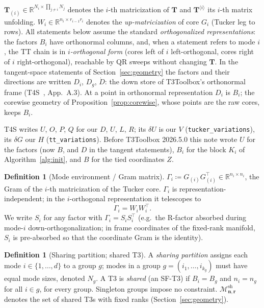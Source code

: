 \documentclass[11pt]{article}
\theoremstyle{definition}
\newtheorem{definition}[theorem]{Definition}
\theoremstyle{remark}
\newcommand{\R}{\mathbb{R}}
\newcommand{\T}{\boldsymbol{T}}
\newcommand{\Msh}{\mathcal{M}^{\mathrm{sh}}_{\boldsymbol{n},\boldsymbol{r}}}
\begin{document}
$\T_{(i)} \in \R^{N_i \times \prod_{j\neq i} N_j}$ denotes the $i$-th
matricization of $\T$ and $\T^{\langle i \rangle}$ its $i$-th matrix
unfolding. $W_i \in \R^{n_i \times r_{i-1} r_i}$ denotes the
\emph{up-matricization} of core $G_i$ (Tucker leg to rows). All statements
below assume the standard \emph{orthogonalized representations}: the factors
$B_i$ have orthonormal columns, and, when a statement refers to mode $i$, the
TT chain is in \emph{$i$-orthogonal form} (cores left of $i$ left-orthogonal,
cores right of $i$ right-orthogonal), reachable by QR sweeps without changing
$\T$. In the tangent-space statements of Section~\ref{sec:geometry} the
factors and their directions are written $D_i$, $D_g$, $\dot D$: the down
store of T3Toolbox's orthonormal frame (T4S~\cite{T4S}, App.~A.3). At a point
in orthonormal representation $D_i$ is $B_i$; the corewise geometry of
Proposition~\ref{prop:corewise}, whose points are the raw cores, keeps $B_i$.

T4S writes $U$, $O$, $P$, $Q$ for our $D$, $U$, $L$, $R$; its $\delta U$ is
our $V$ (\texttt{tucker\_variations}), its $\delta G$ our $H$
(\texttt{tt\_variations}). Before T3Toolbox 2026.5.0 this note wrote $U$ for
the factors (now $B$, and $D$ in the tangent statements), $B_i$ for the block
$K_i$ of Algorithm~\ref{alg:init}, and $B$ for the tied coordinates $Z$.

\begin{definition}[Mode environment / Gram matrix]\label{def:gram}
$\Gamma_i \coloneqq G_{(i)} G_{(i)}^\top \in \R^{n_i \times n_i}$, the Gram of
the $i$-th matricization of the Tucker core. $\Gamma_i$ is
representation-independent; in the $i$-orthogonal representation it
telescopes to
\[
\Gamma_i = W_i W_i^\top .
\]
We write $S_i$ for any factor with $\Gamma_i = S_i S_i^\top$ (e.g.\ the
R-factor absorbed during mode-$i$ down-orthogonalization; in frame coordinates
of the fixed-rank manifold, $S_i$ is pre-absorbed so that the coordinate Gram
is the identity).
\end{definition}

\begin{definition}[Sharing partition; shared T3]\label{def:sharing}
A \emph{sharing partition} assigns each mode $i \in \{1,\ldots,d\}$ to a group
$g$; modes in a group $g = (i_1, \ldots, i_{k_g})$ must have equal mode sizes,
denoted $N_g$. A T3 is \emph{shared} (an SF-T3) if $B_{i} = B_{g}$ and
$n_i = n_g$ for all $i \in g$, for every group. Singleton groups impose no
constraint. $\Msh$ denotes the set of shared T3s with fixed ranks
(Section~\ref{sec:geometry}).
\end{definition}
\end{document}
